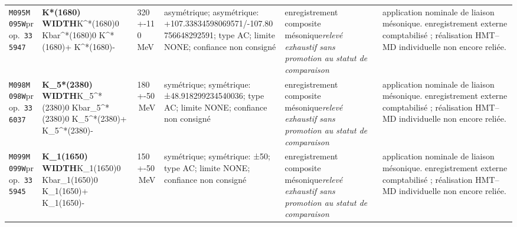 \begin{landscape}
\begin{longtable}{L{1.85cm}L{4.45cm}L{2.35cm}L{4.05cm}L{3.35cm}L{7.15cm}}
\texttt{M095}\newline \texttt{M095W}\newline prop.\ \texttt{335947} & \textbf{K*(1680) WIDTH}\newline K\textasciicircum{}*(1680)0 \textbar{}\allowbreak{} Kbar\textasciicircum{}*(1680)0 \textbar{}\allowbreak{} K\textasciicircum{}*(1680)+ \textbar{}\allowbreak{} K\textasciicircum{}*(1680)- & 320+-110\,MeV & asymétrique; asymétrique: +107.33834598069571/-107.80756648292591; type AC; limite NONE; confiance non consigné & enregistrement composite mésonique\newline \emph{relevé exhaustif sans promotion au statut de comparaison} & application nominale de liaison mésonique. enregistrement externe comptabilisé ; réalisation HMT--MD individuelle non encore reliée. \\
\texttt{M098}\newline \texttt{M098W}\newline prop.\ \texttt{336037} & \textbf{K\_\allowbreak{}5*(2380) WIDTH}\newline K\_\allowbreak{}5\textasciicircum{}*(2380)0 \textbar{}\allowbreak{} Kbar\_\allowbreak{}5\textasciicircum{}*(2380)0 \textbar{}\allowbreak{} K\_\allowbreak{}5\textasciicircum{}*(2380)+ \textbar{}\allowbreak{} K\_\allowbreak{}5\textasciicircum{}*(2380)- & 180+-50\,MeV & symétrique; symétrique: ±48.918299234540036; type AC; limite NONE; confiance non consigné & enregistrement composite mésonique\newline \emph{relevé exhaustif sans promotion au statut de comparaison} & application nominale de liaison mésonique. enregistrement externe comptabilisé ; réalisation HMT--MD individuelle non encore reliée. \\
\texttt{M099}\newline \texttt{M099W}\newline prop.\ \texttt{335945} & \textbf{K\_\allowbreak{}1(1650) WIDTH}\newline K\_\allowbreak{}1(1650)0 \textbar{}\allowbreak{} Kbar\_\allowbreak{}1(1650)0 \textbar{}\allowbreak{} K\_\allowbreak{}1(1650)+ \textbar{}\allowbreak{} K\_\allowbreak{}1(1650)- & 150+-50\,MeV & symétrique; symétrique: ±50; type AC; limite NONE; confiance non consigné & enregistrement composite mésonique\newline \emph{relevé exhaustif sans promotion au statut de comparaison} & application nominale de liaison mésonique. enregistrement externe comptabilisé ; réalisation HMT--MD individuelle non encore reliée. \\

\end{longtable}
\end{landscape}

